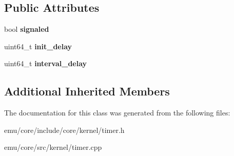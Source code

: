 \subsection*{Public Attributes}
\begin{DoxyCompactItemize}
\item 
\mbox{\label{classeka2l1_1_1kernel_1_1timer_a7d63d1fe1f2dbc5ca9bf117f663aa127}} 
bool {\bfseries signaled}
\item 
\mbox{\label{classeka2l1_1_1kernel_1_1timer_ac1acc8fff2a810520eb7b880765688a5}} 
uint64\+\_\+t {\bfseries init\+\_\+delay}
\item 
\mbox{\label{classeka2l1_1_1kernel_1_1timer_ae2c76748ffa7bc5646754e797e05a667}} 
uint64\+\_\+t {\bfseries interval\+\_\+delay}
\end{DoxyCompactItemize}
\subsection*{Additional Inherited Members}


The documentation for this class was generated from the following files\+:\begin{DoxyCompactItemize}
\item 
emu/core/include/core/kernel/timer.\+h\item 
emu/core/src/kernel/timer.\+cpp\end{DoxyCompactItemize}
